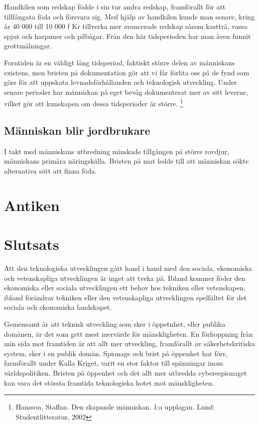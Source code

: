 \documentclass[a4paper,12pt,fleqn]{article}
\begin{document}
Handkilen som redskap födde i sin tur andra redskap, framförallt för att tillfångata föda och försvara sig. Med hjälp av handkilen kunde man senare, kring år 40 000 till 10 000 f Kr tillverka mer avancerade redskap såsom kastträ, vassa spjut och harpuner och pilbågar. Från den här tidsperioden har man även funnit grottmålningar.

Forntiden är en väldigt lång tidsperiod, faktiskt större delen av människans existens, men bristen på dokumentation gör att vi får förlita oss på de fynd som görs för att uppskata levnadsförhållanden och teknologisk utveckling. Under senare perioder har människan på eget bevåg dokumenterat mer av sitt leverne, vilket gör att kunskapen om dessa tidsperioder är större. \footnote{Hansson, Staffan. Den skapande människan. 1:a upplagan. Lund: Studentlitteratur, 2002}

\subsection{Människan blir jordbrukare}
I takt med människans utbredning minskade tillgången på större rovdjur, människans primära näringskälla. Bristen på mat ledde till att människan sökte alternativa sätt att finna föda. 

\newpage
\section{Antiken}



\newpage

\section{Slutsats}

Att den teknologiska utvecklingen gått hand i hand med den sociala, ekonomiska och vetenskapliga utvecklingen är inget att tveka på. Ibland kommer föder den ekonomiska eller sociala utvecklingen ett behov hos tekniken eller vetenskapen, ibland förändrar tekniken eller den vetenskapliga utvecklingen spelfältet för det sociala och ekonomiska landskapet. 

Gemensamt är att teknisk utveckling som sker i öppetnhet, eller publika domänen, är det som gett mest mervärde för mänskligheten. En förhoppning från min sida mot framtiden är att allt mer utveckling, framförallt av säkerhetskritiska system, sker i en publik domän. Spionage och brist på öppenhet har förr, farmförallt under Kalla Kriget, varit en stor faktor till spänningar inom världspolitiken. Bristen på öppenhet och det allt mer utbredda cyberespionaget kan vara det största framtida teknologiska hotet mot mänskligheten. 
\end{document}
